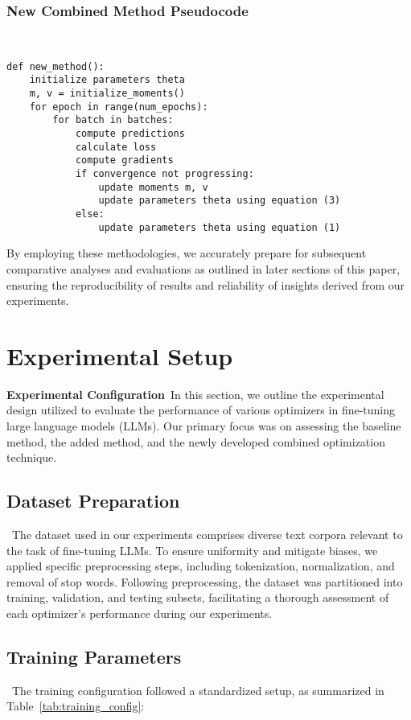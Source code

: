 \documentclass{article} %
\begin{document}
\subsubsection{New Combined Method Pseudocode}  \
\begin{verbatim}  
def new_method():  
    initialize parameters theta  
    m, v = initialize_moments()  
    for epoch in range(num_epochs):  
        for batch in batches:  
            compute predictions  
            calculate loss  
            compute gradients  
            if convergence not progressing:  
                update moments m, v  
                update parameters theta using equation (3)  
            else:  
                update parameters theta using equation (1)  
\end{verbatim}  
By employing these methodologies, we accurately prepare for subsequent comparative analyses and evaluations as outlined in later sections of this paper, ensuring the reproducibility of results and reliability of insights derived from our experiments.

\section{Experimental Setup}
\label{sec:experimental}
\textbf{Experimental Configuration}\
\noindent In this section, we outline the experimental design utilized to evaluate the performance of various optimizers in fine-tuning large language models (LLMs). Our primary focus was on assessing the baseline method, the added method, and the newly developed combined optimization technique.

\subsection{Dataset Preparation}\
\noindent The dataset used in our experiments comprises diverse text corpora relevant to the task of fine-tuning LLMs. To ensure uniformity and mitigate biases, we applied specific preprocessing steps, including tokenization, normalization, and removal of stop words. Following preprocessing, the dataset was partitioned into training, validation, and testing subsets, facilitating a thorough assessment of each optimizer's performance during our experiments.

\subsection{Training Parameters}\
\noindent The training configuration followed a standardized setup, as summarized in Table~\ref{tab:training_config}:
\end{document}
